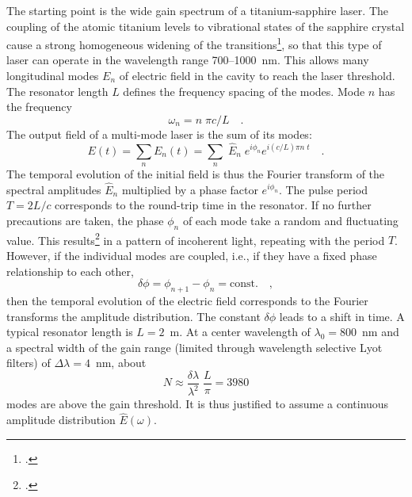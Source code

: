 The starting point is the  wide gain spectrum of a
titanium-sapphire laser. The coupling of the atomic titanium levels to
vibrational states of the sapphire crystal cause a strong
homogeneous widening of the transitions\footcite[chapter 4]{Rulliere2005}, so that
this type of laser can operate in the wavelength range 700--1000~nm. This allows many longitudinal modes $E_n$  of
electric field in the cavity  to reach the laser threshold. The resonator length $L$ defines the frequency spacing of the
modes. Mode $n$ has the frequency 
\begin{equation}
 \omega_n = n \; \pi c / L \quad.
\end{equation}
The output field of a multi-mode laser is the sum of its
modes:
\begin{equation}
  E(t) = \sum_n E_n(t) = \sum_n \; \hat{E}_n \; e^{i \phi_n} e^{i (c/L) \pi n \; t} \quad .
\end{equation}
The temporal evolution of the initial field is thus  the Fourier transform of the  spectral amplitudes $\hat{E}_n$ multiplied by a phase factor $e^{i \phi_n} $. The pulse period  $T = 2L /c$  corresponds to the round-trip  time in the resonator.
If no further precautions are taken, the
phase $\phi_n$ of each mode take a random  and fluctuating value. This
results\footcite{DielsRudolph1996} in a  pattern of incoherent light, repeating with the period $T$.
However, if the individual modes are coupled, i.e., if they 
have a fixed phase relationship to each other,
\begin{equation}
   \delta \phi = \phi_{n+1} - \phi_n = \text{const.} \quad,
   \label{gl_theo_nlo_ml_phiconst}
\end{equation}
then the temporal evolution of the electric field corresponds to the
Fourier transforms the amplitude distribution. The constant
$\delta \phi$ leads to a shift in  time. A typical resonator length is $L = 2$~m. At
a center wavelength of $\lambda_0 = 800$~nm and a
spectral width of the gain range (limited through 
wavelength selective Lyot filters) of $\Delta \lambda =
4$~nm, about
\begin{equation}
 N \approx \frac{\delta \lambda}{ \lambda^2} \; \frac{L}{\pi} =
 3980
\end{equation}
modes are above the gain threshold. It is thus justified to assume  a
continuous amplitude distribution $\hat{E}(\omega)$.

